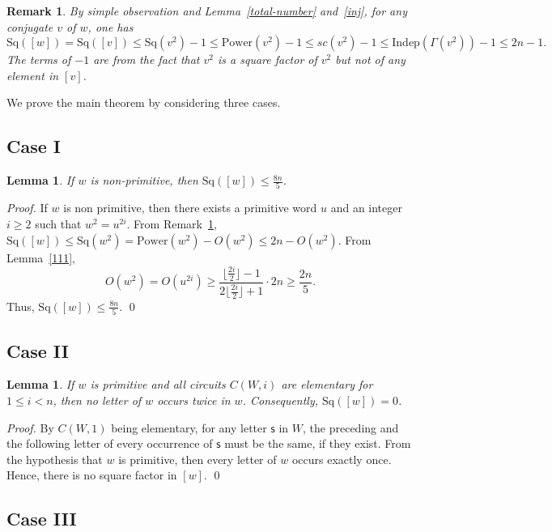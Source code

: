 \documentclass[runningheads,envcountsame,a4paper]{llncs}
\newtheorem{lem}[thm]{Lemma}
\newtheorem{rmk}[thm]{Remark}
\newcommand{\pow}{\mathrm{Power}}
\newcommand{\sq}{\mathrm{Sq}}
\newcommand{\indep}{\mathrm{Indep}}
\begin{document}
\begin{rmk}
\label{rmk-eq1}
    By simple observation and Lemma~\ref{total-number} and~\ref{inj}, for any conjugate $v$ of $w$, one has
$$\sq([w])=\sq([v])\le \sq(v^2)-1\le\pow(v^2)-1\le sc(v^2)-1\le\indep(\Gamma(v^2))-1\le 2n-1.$$
The terms of $-1$ are from the fact that $v^2$ is a square factor of $v^2$ but not of any element in $[v]$. 
\end{rmk}

We prove the main theorem by considering three cases. 

\subsection{Case I}
\begin{lem}\label{multi}
If $w$ is non-primitive, then $\sq([w])\leq \frac{8n}{5}$.
\end{lem}

\begin{proof}
If $w$ is non primitive, then there exists a primitive word $u$ and an integer $i\geq 2$ such that $w^2=u^{2i}$. From Remark~\ref{rmk-eq1}, $\sq([w])\leq \sq(w^2)=\pow(w^2)-O(w^2) \leq 2n-O(w^2)$. From Lemma~\ref{111}, 
$$O(w^2)=O(u^{2i}) \geq \frac{\lfloor \frac {2i}2 \rfloor-1}{2\lfloor \frac {2i}2 \rfloor+1}\cdot 2n \geq \frac{2n}{5}.$$ Thus, $\sq([w])\leq \frac{8n}{5}$. \qed  
\end{proof}

\subsection{Case II}
\begin{lem}\label{simple}
If $w$ is primitive and all circuits $C(W,i)$ are elementary for $1\le i<n$, then no letter of $w$ occurs twice in $w$. Consequently, $\sq([w])=0$.
\end{lem}

\begin{proof}
 By $C(W,1)$ being elementary, for any letter $\mathsf{s}$ in $W$, the preceding and the following letter of every occurrence of $\mathsf{s}$ must be the same, if they exist. From the hypothesis that $w$ is primitive, then every letter of $w$ occurs exactly once. Hence, there is no square factor in $[w]$. \qed
\end{proof}

\subsection{Case III}
\end{document}
